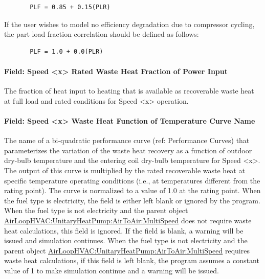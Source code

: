 \begin{lstlisting}
       PLF = 0.85 + 0.15(PLR)
\end{lstlisting}

If the user wishes to model no efficiency degradation due to compressor cycling, the part load fraction correlation should be defined as follows:

\begin{lstlisting}
       PLF = 1.0 + 0.0(PLR)
\end{lstlisting}

\paragraph{Field: Speed \textless{}x\textgreater{} Rated Waste Heat Fraction of Power Input}\label{field-speed-x-rated-waste-heat-fraction-of-power-input-1}

The fraction of heat input to heating that is available as recoverable waste heat at full load and rated conditions for Speed \textless{}x\textgreater{} operation.

\paragraph{Field: Speed \textless{}x\textgreater{} Waste Heat Function of Temperature Curve Name}\label{field-speed-x-waste-heat-function-of-temperature-curve-name-1}

The name of a bi-quadratic performance curve (ref: Performance Curves) that parameterizes the variation of the waste heat recovery as a function of outdoor dry-bulb temperature and the entering coil dry-bulb temperature for Speed \textless{}x\textgreater{}. The output of this curve is multiplied by the rated recoverable waste heat at specific temperature operating conditions (i.e., at temperatures different from the rating point). The curve is normalized to a value of 1.0 at the rating point. When the fuel type is electricity, the field is either left blank or ignored by the program. When the fuel type is not electricity and the parent object \hyperref[airloophvacunitaryheatpumpairtoairmultispeed]{AirLoopHVAC:UnitaryHeatPump:AirToAir:MultiSpeed} does not require waste heat calculations, this field is ignored. If the field is blank, a warning will be issued and simulation continues. When the fuel type is not electricity and the parent object \hyperref[airloophvacunitaryheatpumpairtoairmultispeed]{AirLoopHVAC:UnitaryHeatPump:AirToAir:MultiSpeed} requires waste heat calculations, if this field is left blank, the program assumes a constant value of 1 to make simulation continue and a warning will be issued.

